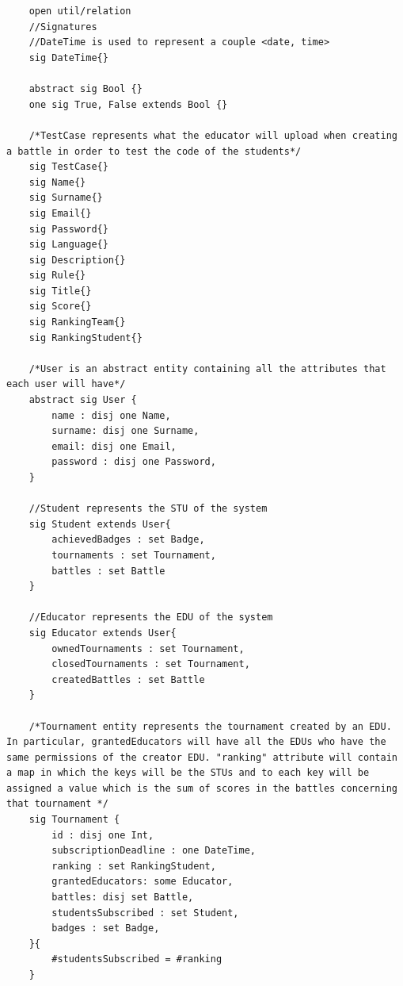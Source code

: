 \begin{lstlisting}[language=Alloy,  label={lst:alloycode}, basicstyle=\fontfamily{Roboto}\selectfont\ttfamily]
       
    
    open util/relation
    //Signatures
    //DateTime is used to represent a couple <date, time>
    sig DateTime{}
    
    abstract sig Bool {}
    one sig True, False extends Bool {}
    
    /*TestCase represents what the educator will upload when creating a battle in order to test the code of the students*/
    sig TestCase{}
    sig Name{}
    sig Surname{}
    sig Email{}
    sig Password{}
    sig Language{}
    sig Description{}
    sig Rule{}
    sig Title{}
    sig Score{}
    sig RankingTeam{}
    sig RankingStudent{}
    
    /*User is an abstract entity containing all the attributes that each user will have*/ 
    abstract sig User {
        name : disj one Name,
        surname: disj one Surname,
        email: disj one Email,
        password : disj one Password,
    }
    
    //Student represents the STU of the system
    sig Student extends User{
        achievedBadges : set Badge,
        tournaments : set Tournament,
        battles : set Battle
    }
    
    //Educator represents the EDU of the system
    sig Educator extends User{
        ownedTournaments : set Tournament,
        closedTournaments : set Tournament,
        createdBattles : set Battle
    }
    
    /*Tournament entity represents the tournament created by an EDU. In particular, grantedEducators will have all the EDUs who have the same permissions of the creator EDU. "ranking" attribute will contain a map in which the keys will be the STUs and to each key will be assigned a value which is the sum of scores in the battles concerning that tournament */
    sig Tournament {
        id : disj one Int,
        subscriptionDeadline : one DateTime,
        ranking : set RankingStudent, 
        grantedEducators: some Educator,
        battles: disj set Battle,
        studentsSubscribed : set Student,
        badges : set Badge,
    }{
        #studentsSubscribed = #ranking
    }    
    

\end{lstlisting}

